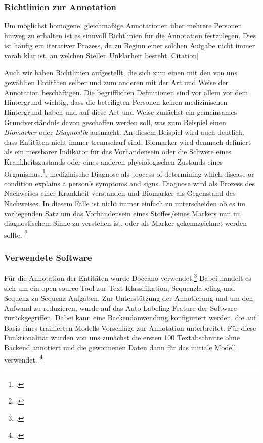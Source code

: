 
\subsubsection{Richtlinien zur Annotation}\label{sec:Richtlinien}
Um möglichst homogene, gleichmäßige Annotationen über mehrere Personen hinweg zu erhalten ist es sinnvoll Richtlinien für die Annotation festzulegen. Dies ist häufig ein iterativer Prozess, da zu Beginn einer solchen Aufgabe nicht immer vorab klar ist, an welchen Stellen Unklarheit besteht.[Citation]

Auch wir haben Richtlinien aufgestellt, die sich zum einen mit den von uns gewählten Entitäten selber und zum anderen mit der Art und Weise der Annotation beschäftigen. Die begrifflichen Definitionen sind vor allem vor dem Hintergrund wichtig, dass die beteiligten Personen keinen medizinischen Hintergrund haben und auf diese Art und Weise zunächst ein gemeinsames Grundverständnis davon geschaffen werden soll, was zum Beispiel einen \textit{Biomarker} oder \textit{Diagnostik} ausmacht. An diesem Beispiel wird auch deutlich, dass Entitäten nicht immer trennscharf sind. Biomarker wird demnach definiert als \glqq{}ein messbarer Indikator für das Vorhandensein oder die Schwere eines Krankheitszustands oder eines anderen physiologischen Zustands eines Organismus.\grqq{}\footcite[vgl.]{wiki2021}, medizinische Diagnose als \glqq{}process of determining which disease or condition explains a person's symptoms and signs.\grqq{} Diagnose wird als Prozess des Nachweises einer Krankheit verstanden und Biomarker als Gegenstand des Nachweises. In diesem Falle ist nicht immer einfach zu unterscheiden ob es im vorliegenden Satz um das Vorhandensein eines Stoffes/eines Markers nun im diagnostischem Sinne zu verstehen ist, oder als Marker gekennzeichnet werden sollte.
\footcite[vgl.][]{neves2014}

\subsubsection{Verwendete Software}\label{sec:Software}
Für die Annotation der Entitäten wurde Doccano verwendet.\footcite[vgl.][S.]{hirokinakayama2021} Dabei handelt es sich um ein open source Tool zur Text Klassifikation, Sequenzlabeling und Sequenz zu Sequenz Aufgaben.
Zur Unterstützung der Annotierung und um den Aufwand zu reduzieren, wurde auf das Auto Labeling Feature der Software zurückgegriffen. Dabei kann eine Backendanwendung konfiguriert werden, die auf Basis eines trainierten Modells Vorschläge zur Annotation unterbreitet.
Für diese Funktionalität wurden von uns zunächst die ersten 100 Textabschnitte ohne Backend annotiert und die gewonnenen Daten dann für das initiale Modell verwendet.
\footcite[vgl.][]{neves2014a}

